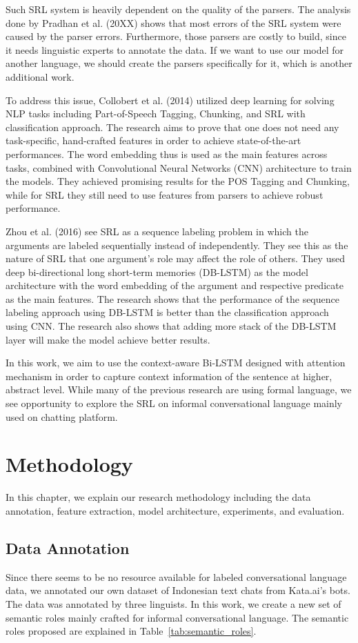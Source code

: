Such SRL system is heavily dependent on the quality of the parsers. The analysis done by Pradhan et al. (20XX) shows that most errors of the SRL system were caused by the parser errors. Furthermore, those parsers are costly to build, since it needs linguistic experts to annotate the data. If we want to use our model for another language, we should create the parsers specifically for it, which is another additional work.

To address this issue, Collobert et al. (2014) utilized deep learning for solving NLP tasks including Part-of-Speech Tagging, Chunking, and SRL with classification approach. The research aims to prove that one does not need any task-specific, hand-crafted features in order to achieve state-of-the-art performances. The word embedding thus is used as the main features across tasks, combined with Convolutional Neural Networks (CNN) architecture to train the models. They achieved promising results for the POS Tagging and Chunking, while for SRL they still need to use features from parsers to achieve robust performance.

Zhou et al. (2016) see SRL as a sequence labeling problem in which the arguments are labeled sequentially instead of independently. They see this as the nature of SRL that one argument’s role may affect the role of others. They used deep bi-directional long short-term memories (DB-LSTM) as the model architecture with the word embedding of the argument and respective predicate as the main features. The research shows that the performance of the sequence labeling approach using DB-LSTM is better than the classification approach using CNN. The research also shows that adding more stack of the DB-LSTM layer will make the model achieve better results.

In this work, we aim to use the context-aware Bi-LSTM designed with attention mechanism in order to capture context information of the sentence at higher, abstract level. While many of the previous research are using formal language, we see opportunity to explore the SRL on informal conversational language mainly used on chatting platform.

\section{Methodology}
In this chapter, we explain our research methodology including the data annotation, feature extraction, model architecture, experiments, and evaluation.

\subsection{Data Annotation}
Since there seems to be no resource available for labeled conversational language data, we annotated our own dataset of Indonesian text chats from Kata.ai’s bots. The data was annotated by three linguists. In this work, we create a new set of semantic roles mainly crafted for informal conversational language. The semantic roles proposed are explained in Table~\ref{tab:semantic_roles}.

